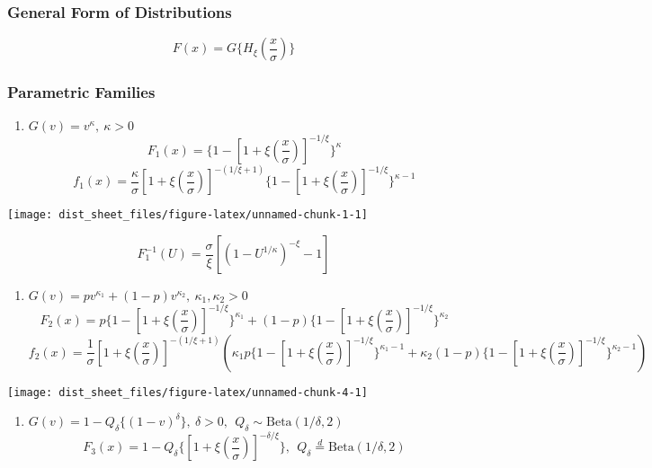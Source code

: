 \documentclass[
]{article}
\author{}
\date{\vspace{-2.5em}}
\providecommand{\tightlist}{%
  \setlength{\itemsep}{0pt}\setlength{\parskip}{0pt}}
\begin{document}
\hypertarget{general-form-of-distributions}{%
\subsubsection{General Form of
Distributions}\label{general-form-of-distributions}}

\[F(x) = G\{H_{\xi}{(\frac{x}{\sigma})} \} \]

\hypertarget{parametric-families}{%
\subsubsection{Parametric Families}\label{parametric-families}}

\begin{enumerate}
\def\labelenumi{\arabic{enumi}.}
\tightlist
\item
  \(G(v) = v^\kappa, \ \kappa > 0\)
  \[F_1(x) = \{1 - [1 + \xi(\frac{x}{\sigma})]^{-1/\xi} \}^\kappa\]
  \[f_1(x) = \frac{\kappa}{\sigma}[1 + \xi (\frac{x}{\sigma})]^{-(1/\xi + 1)}\{1 - [1+\xi(\frac{x}{\sigma})]^{-1/\xi} \} ^{\kappa-1}\]
\end{enumerate}

\begin{center}\texttt{[image: dist\_sheet\_files/figure-latex/unnamed-chunk-1-1]} \end{center}

\[F_1^{-1}(U) = \frac{\sigma}{\xi} [(1-U^{1/\kappa})^{-\xi} - 1]\]

\begin{enumerate}
\def\labelenumi{\arabic{enumi}.}
\setcounter{enumi}{1}
\tightlist
\item
  \(G(v) = pv^{\kappa_1} + (1-p)v^{\kappa_2}, \ \kappa_1, \kappa_2 >0\)
  \[F_2(x) = p\{1 - [1 + \xi(\frac{x}{\sigma})]^{-1/\xi} \}^{\kappa_1} + (1-p)\{1 - [1 + \xi(\frac{x}{\sigma})]^{-1/\xi} \}^{\kappa_2}\]
  \[f_2(x) = \frac{1}{\sigma}[1 + \xi (\frac{x}{\sigma})]^{-(1/\xi + 1)}\left(\kappa_1p\{1 - [1+\xi(\frac{x}{\sigma})]^{-1/\xi} \} ^{\kappa_1-1} + \kappa_2(1-p)\{1 - [1+\xi(\frac{x}{\sigma})]^{-1/\xi} \} ^{\kappa_2-1}\right)\]
\end{enumerate}

\begin{center}\texttt{[image: dist\_sheet\_files/figure-latex/unnamed-chunk-4-1]} \end{center}

\pagebreak

\begin{enumerate}
\def\labelenumi{\arabic{enumi}.}
\setcounter{enumi}{2}
\tightlist
\item
  \(G(v) = 1-Q_\delta\{(1-v)^\delta\}, \ \delta > 0, \ \ Q_\delta \sim \text{Beta}(1/\delta, 2)\)
  \[F_3(x) = 1 - Q_\delta\{[1 + \xi(\frac{x}{\sigma})]^{-\delta/\xi} \}, \ \ Q_\delta \stackrel{d}{=}\text{Beta}(1/\delta, 2)\]
\end{enumerate}
\end{document}
